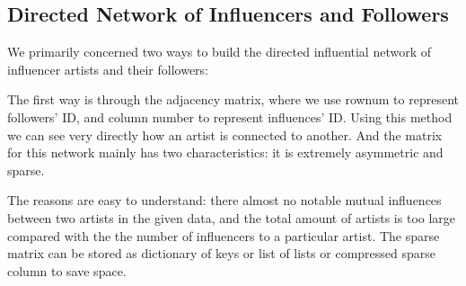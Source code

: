 \documentclass[12pt]{article}
\begin{document}
\subsection{Directed Network of Influencers and Followers }\quad\;

We primarily concerned two ways to build the directed influential network of influencer artists and their followers: 


The first way is through the adjacency matrix, where we use rownum to represent followers' ID, and column number to represent influences' ID. Using this method we can see very directly how an artist is connected to another. And the matrix for this network mainly has two characteristics: it is extremely asymmetric and sparse. 

The reasons are easy to understand: there almost no notable mutual influences between two artists in the given data, and the total amount of artists is too large compared with the the number of influencers to a particular artist. The sparse matrix can be stored as dictionary of keys or list of lists or compressed sparse column to save space.
\end{document}
